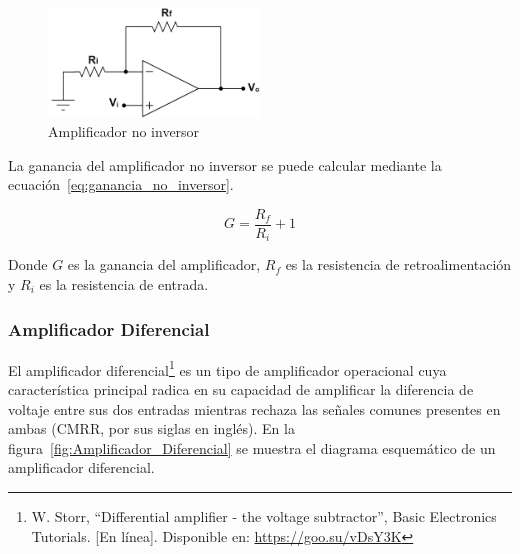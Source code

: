             \begin{figure}[H]
                \centering
                \includegraphics[width=0.5\textwidth]{img/Marco/Amplificador_No_Inversor.png}
                \caption[Amplificador no inversor]{Amplificador no inversor\footnotemark}
                \label{fig:Amplificador_No_Inversor}
            \end{figure}

            La ganancia del amplificador no inversor se puede calcular mediante la ecuación~\ref{eq:ganancia_no_inversor}.

            \begin{equation}
                \label{eq:ganancia_no_inversor}
                G = \frac{R_f}{R_i} + 1
            \end{equation}

            Donde $G$ es la ganancia del amplificador, $R_f$ es la resistencia de retroalimentación y $R_i$ es la resistencia de entrada.

        \subsubsection{Amplificador Diferencial}
            El amplificador diferencial\footnote{W. Storr, ``Differential amplifier - the voltage subtractor'', Basic Electronics Tutorials. [En línea]. Disponible en: \url{https://goo.su/vDsY3K}} es un tipo de amplificador operacional cuya característica principal radica en su capacidad de amplificar la diferencia de voltaje entre sus dos entradas mientras rechaza las señales comunes presentes en ambas (CMRR, por sus siglas en inglés). En la figura~\ref{fig:Amplificador_Diferencial} se muestra el diagrama esquemático de un amplificador diferencial.

